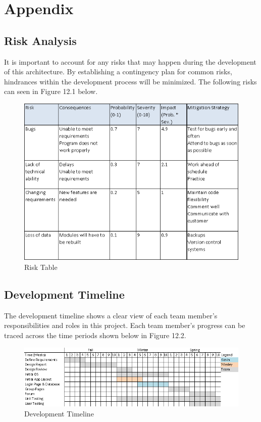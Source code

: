 \chapter{Appendix}

\section{Risk Analysis}
It is important to account for any risks that may happen during the development of this architecture. By establishing a contingency plan for common risks, hindrances within the development process will be minimized. The following risks can seen in Figure 12.1 below.

\begin{figure}[h]
	\includegraphics[width=\linewidth]{images/risk_analysis.png}
	\caption{Risk Table}
	\label{fig:risk table}
	\centering
\end{figure}

\clearpage
\newpage

\section{Development Timeline}
The development timeline shows a clear view of each team member’s responsibilities and roles in this project. Each team member’s progress can be traced across the time periods shown below in Figure 12.2.

\begin{figure}[h]
	\includegraphics[width=\linewidth]{images/timeline.png}
	\caption{Development Timeline}
	\label{fig:timeline}
	\centering
\end{figure}